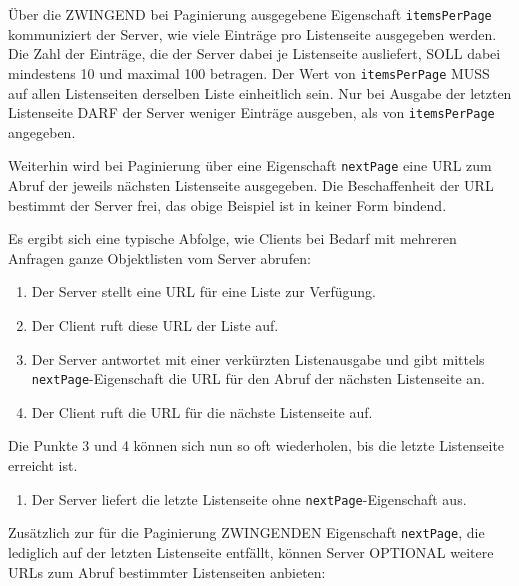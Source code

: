 \documentclass[,a4paper]{article}
\begin{document}
Über die ZWINGEND bei Paginierung ausgegebene Eigenschaft
\texttt{itemsPerPage} kommuniziert der Server, wie viele Einträge pro
Listenseite ausgegeben werden. Die Zahl der Einträge, die der Server
dabei je Listenseite ausliefert, SOLL dabei mindestens 10 und maximal
100 betragen. Der Wert von \texttt{itemsPerPage} MUSS auf allen
Listenseiten derselben Liste einheitlich sein. Nur bei Ausgabe der
letzten Listenseite DARF der Server weniger Einträge ausgeben, als von
\texttt{itemsPerPage} angegeben.

Weiterhin wird bei Paginierung über eine Eigenschaft \texttt{nextPage}
eine URL zum Abruf der jeweils nächsten Listenseite ausgegeben. Die
Beschaffenheit der URL bestimmt der Server frei, das obige Beispiel ist
in keiner Form bindend.

Es ergibt sich eine typische Abfolge, wie Clients bei Bedarf mit
mehreren Anfragen ganze Objektlisten vom Server abrufen:

\begin{enumerate}
\def\labelenumi{\arabic{enumi}.}
\item
  Der Server stellt eine URL für eine Liste zur Verfügung.
\item
  Der Client ruft diese URL der Liste auf.
\item
  Der Server antwortet mit einer verkürzten Listenausgabe und gibt
  mittels \texttt{nextPage}-Eigenschaft die URL für den Abruf der
  nächsten Listenseite an.
\item
  Der Client ruft die URL für die nächste Listenseite auf.
\end{enumerate}

Die Punkte 3 und 4 können sich nun so oft wiederholen, bis die letzte
Listenseite erreicht ist.

\begin{enumerate}
\def\labelenumi{\arabic{enumi}.}
\setcounter{enumi}{4}
\itemsep1pt\parskip0pt
\item
  Der Server liefert die letzte Listenseite ohne
  \texttt{nextPage}-Eigenschaft aus.
\end{enumerate}

Zusätzlich zur für die Paginierung ZWINGENDEN Eigenschaft
\texttt{nextPage}, die lediglich auf der letzten Listenseite entfällt,
können Server OPTIONAL weitere URLs zum Abruf bestimmter Listenseiten
anbieten:
\end{document}
